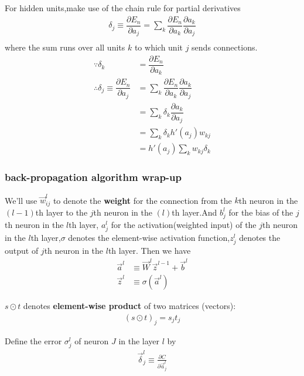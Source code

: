 For hidden units,make use of the chain rule for partial derivatives
\begin{align}
    \delta_j\equiv \dfrac{\partial E_n}{\partial a_j}=
    \sum_k \dfrac{\partial E_n}{\partial a_k}\dfrac{\partial a_k}{\partial a_j} \\
\end{align}
where the sum runs over all units $k$ to which unit $j$ sends connections.
\begin{align}
    \because \delta_k &= \dfrac{\partial E_n}{\partial a_k}\\
    \therefore
    \delta_j\equiv \dfrac{\partial E_n}{\partial a_j} &=
    \sum_k \dfrac{\partial E_n}{\partial a_k}\dfrac{\partial a_k}{\partial a_j} \\
    &=\sum_k \delta_k\dfrac{\partial a_k}{\partial a_j} \\
    &=\sum_k \delta_k h'(a_j)w_{kj} \\
    &= h'(a_j)\sum_k w_{kj}\delta_k
\end{align}

\subsubsection{back-propagation algorithm wrap-up}

We'll use $\vec{w}_{ij}^{l}$ to denote the \textbf{weight} for the connection from the $k$th neuron in the $(l-1)$th layer to the $j$th neuron in the $(l)$th layer.And $b_j^l$  for the bias of the $j$th neuron in the $l$th layer, $a_j^l$ for the activation(weighted input) of the $j$th neuron in the $l$th layer,$\sigma$ denotes the element-wise activation function,$z_j^l$ denotes the output of $j$th neuron in the $l$th layer.
Then we have
\begin{align}
	\vec{a}^l &\equiv \vec{W}^l \vec{z}^{l-1}+\vec{b}^l \\
	\vec{z}^{l} &\equiv \sigma(\vec{a}^{l})
\end{align}

$s\odot t$ denotes \textbf{element-wise product} of two matrices (vectors):
\begin{align}
(s\odot t)_j = s_jt_j
\end{align}

Define the error $\sigma_j^l$ of neuron $J$ in the layer $l$ by
\begin{align}
\vec{\delta}^l_j \equiv \frac{\partial C}{\partial \vec{a}^l_j}
\end{align}

